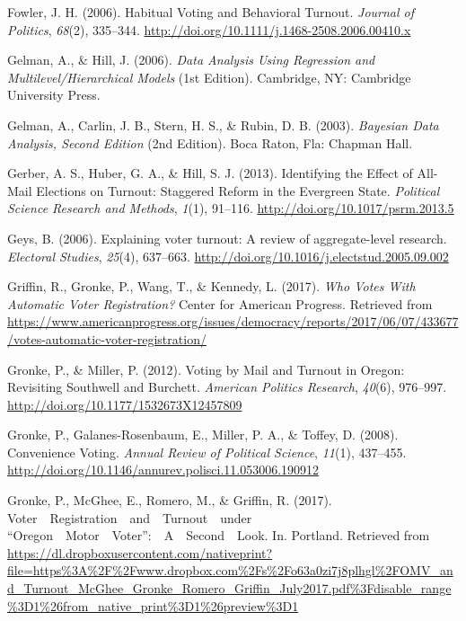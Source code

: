 \documentclass[12pt,twoside]{reedthesis}
\begin{document}
  \hypertarget{ref-fowler_habitual_2006}{}
  Fowler, J. H. (2006). Habitual Voting and Behavioral Turnout.
  \emph{Journal of Politics}, \emph{68}(2), 335--344.
  \url{http://doi.org/10.1111/j.1468-2508.2006.00410.x}
  
  \hypertarget{ref-gelman_data_2006}{}
  Gelman, A., \& Hill, J. (2006). \emph{Data Analysis Using Regression and
  Multilevel/Hierarchical Models} (1st Edition). Cambridge, NY: Cambridge
  University Press.
  
  \hypertarget{ref-gelman_bayesian_2003}{}
  Gelman, A., Carlin, J. B., Stern, H. S., \& Rubin, D. B. (2003).
  \emph{Bayesian Data Analysis, Second Edition} (2nd Edition). Boca Raton,
  Fla: Chapman Hall.
  
  \hypertarget{ref-gerber_identifying_2013}{}
  Gerber, A. S., Huber, G. A., \& Hill, S. J. (2013). Identifying the
  Effect of All-Mail Elections on Turnout: Staggered Reform in the
  Evergreen State. \emph{Political Science Research and Methods},
  \emph{1}(1), 91--116. \url{http://doi.org/10.1017/psrm.2013.5}
  
  \hypertarget{ref-geys_explaining_2006}{}
  Geys, B. (2006). Explaining voter turnout: A review of aggregate-level
  research. \emph{Electoral Studies}, \emph{25}(4), 637--663.
  \url{http://doi.org/10.1016/j.electstud.2005.09.002}
  
  \hypertarget{ref-griffin_who_2017}{}
  Griffin, R., Gronke, P., Wang, T., \& Kennedy, L. (2017). \emph{Who
  Votes With Automatic Voter Registration?} Center for American Progress.
  Retrieved from
  \url{https://www.americanprogress.org/issues/democracy/reports/2017/06/07/433677/votes-automatic-voter-registration/}
  
  \hypertarget{ref-gronke_voting_2012}{}
  Gronke, P., \& Miller, P. (2012). Voting by Mail and Turnout in Oregon:
  Revisiting Southwell and Burchett. \emph{American Politics Research},
  \emph{40}(6), 976--997. \url{http://doi.org/10.1177/1532673X12457809}
  
  \hypertarget{ref-gronke_convenience_2008}{}
  Gronke, P., Galanes-Rosenbaum, E., Miller, P. A., \& Toffey, D. (2008).
  Convenience Voting. \emph{Annual Review of Political Science},
  \emph{11}(1), 437--455.
  \url{http://doi.org/10.1146/annurev.polisci.11.053006.190912}
  
  \hypertarget{ref-gronke_voter_2017}{}
  Gronke, P., McGhee, E., Romero, M., \& Griffin, R. (2017).
  Voter~~Registration~~and~~Turnout~~under
  ``Oregon~~Motor~~Voter'':~~A~~Second~~Look. In. Portland. Retrieved from
  \url{https://dl.dropboxusercontent.com/nativeprint?file=https\%3A\%2F\%2Fwww.dropbox.com\%2Fs\%2Fo63a0zi7j8plhgl\%2FOMV_and_Turnout_McGhee_Gronke_Romero_Griffin_July2017.pdf\%3Fdisable_range\%3D1\%26from_native_print\%3D1\%26preview\%3D1}
  
\end{document}
